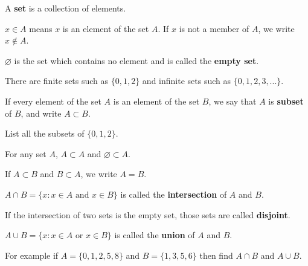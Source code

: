 \documentclass[../main.tex]{subfiles}
\begin{document}
A \textbf{set} is a collection of elements.

$x\in A$ means $x$ is an element of the set $A$.
If $x$ is not a member of $A$, we write $x\notin A$.

$\varnothing$ is the set which contains no element and is called the \textbf{empty set}.

There are finite sets such as $\{0,1,2\}$ and infinite sets such as $\{0,1,2,3,...\}$.

If every element of the set $A$ is an element of the set $B$, we say that $A$ is \textbf{subset} of $B$, and write $A\subset B$.

\begin{example}
  List all the subsets of $\{0,1,2\}$.
\end{example}

For any set $A$, $A\subset A$ and $\varnothing \subset A$.

If $A\subset B$ and $B\subset A$, we write $A=B$.

$A\cap B = \{x:x\in A \text{ and } x\in B\}$ is called the \textbf{intersection} of $A$ and $B$.
\begin{center}
\end{center}

If the intersection of two sets is the empty set, those sets are called \textbf{disjoint}.

$A\cup B=\{x:x\in A \text{ or } x\in B\}$ is called the \textbf{union} of $A$ and $B$.
\begin{center}
\end{center}

\begin{example}
For example if $A=\{0,1,2,5,8\}$ and $B=\{1,3,5,6\}$ then find $A\cap B$ and $A\cup B$.
\end{example}
\end{document}
